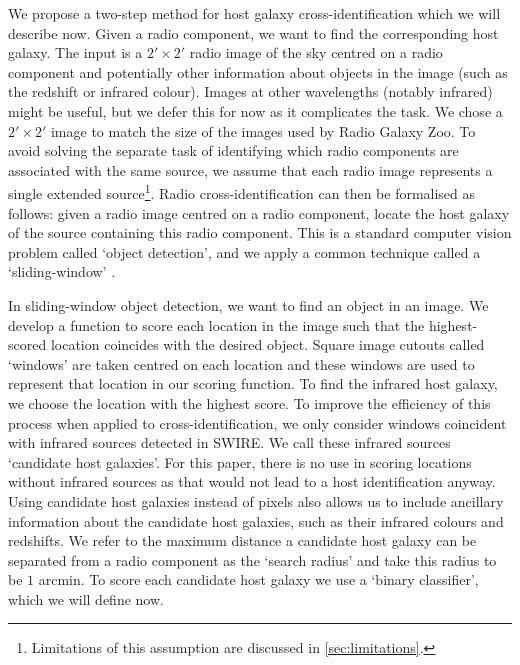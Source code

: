 \documentclass[fleqn,usenatbib,usedcolumn]{mnras}
\newcommand{\edited}[1]{#1}
\begin{document}
    We propose a two-step method for host galaxy cross-identification
    \edited{which we will describe now}. Given a radio component, we want to find
    the corresponding host galaxy. The input is a $2' \times
    2'$ radio image of
    the sky centred on a radio component \edited{and potentially other information about
    objects in the image (such as the redshift or infrared colour)}. \edited{Images at other wavelengths (notably infrared) might be
    useful, but we defer this for now as it complicates the task.
    \edited{We chose a $2' \times 2'$ image to match} the size of the images used
    by Radio Galaxy Zoo. To avoid solving the separate task of identifying
    which radio components are associated with the same source, we assume
    that each radio image represents a single extended
    source\footnote{Limitations of this assumption are discussed in
    \autoref{sec:limitations}.}. Radio cross-identification can then
    be formalised as follows: given a radio image centred on a radio
    component, locate the host galaxy of the source containing this radio
    component. This is a standard computer vision problem called `object
    detection', and we apply a common technique called a `sliding-window'
    \citep{rowley1996facedetection}}.

    \edited{In sliding-window object detection, we want to find an object in an image.
    We develop a function to score each location in the image such that the
    highest-scored location coincides with the desired object. Square image
    cutouts called `windows' are taken centred on each location and these
    windows are used to represent that location in our scoring function. To
    find the infrared host galaxy, we choose the location with the highest
    score. To improve the efficiency of this process when applied to
    cross-identification, we only consider windows coincident with infrared
    sources detected in SWIRE. We call these infrared sources `candidate
    host galaxies'. For this paper, there is no use in scoring
    locations without infrared sources as that would not lead to a host identification
    anyway. Using candidate host galaxies instead of pixels also
    allows us to include ancillary information about the candidate host
    galaxies, such as their infrared colours and redshifts. We refer to the
    maximum distance a candidate host galaxy can be separated from a radio component as
    the `search radius' and take this radius to be $1$ arcmin. To score each
    candidate host galaxy we use a `binary classifier', which we will define
    now.}
\end{document}
